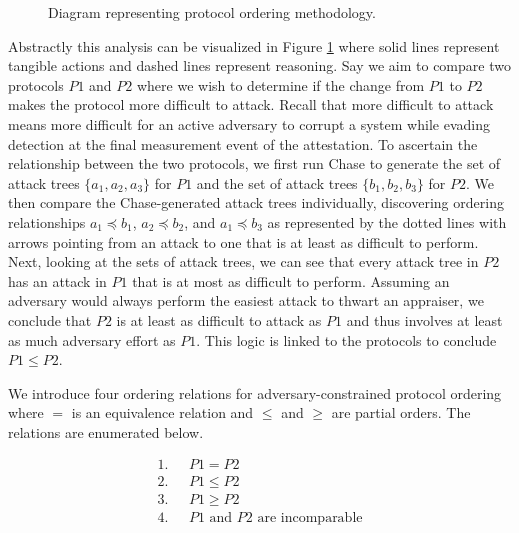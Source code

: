 \documentclass[runningheads]{llncs}
\theoremstyle{definition}
\begin{document}
\begin{figure}[hbtp]
    \centering
    \captionsetup{justification=centering,margin=1cm}
    
    \caption[Protocol ordering abstraction]{Diagram representing protocol ordering methodology. }
    \label{fig:protocol-org-fig}
\end{figure}

Abstractly this analysis can be visualized in Figure \ref{fig:protocol-org-fig} where solid lines represent tangible actions and dashed lines represent reasoning. Say we aim to compare two protocols $P1$ and $P2$ where we wish to determine if the change from $P1$ to $P2$ makes the protocol more difficult to attack. Recall that more difficult to attack means more difficult for an active adversary to corrupt a system while evading detection at the final measurement event of the attestation. To ascertain the relationship between the two protocols, we first run Chase to generate the set of attack trees $\{ a_1, a_2, a_3\}$ for $P1$ and the set of attack trees $\{b_1, b_2, b_3\}$ for $P2$. We then compare the Chase-generated attack trees individually, discovering ordering relationships $a_1 \preceq b_1$, $a_2 \preceq b_2$, and $a_1 \preceq b_3$ as represented by the dotted lines with arrows pointing from an attack to one that is at least as difficult to perform. Next, looking at the sets of attack trees, we can see that every attack tree in $P2$ has an attack in $P1$ that is at most as difficult to perform. Assuming an adversary would always perform the easiest attack to thwart an appraiser, we conclude that $P2$ is at least as difficult to attack as $P1$ and thus involves at least as much adversary effort as $P1$. This logic is linked to the protocols to conclude $P1 \leq P2$.  

We introduce four ordering relations for adversary-constrained protocol ordering where $=$ is an equivalence relation and $\le$ and $\ge$ are partial orders. The relations are enumerated below.

\vspace*{-5mm}

\begin{align*}
1. & \text{ } P1 = P2 \\
2. & \text{ } P1 \le P2 \\
3. & \text{ } P1 \ge P2 \\
4. & \text{ } P1 \text{ and } P2 \text{ are incomparable}
\end{align*}
\end{document}
